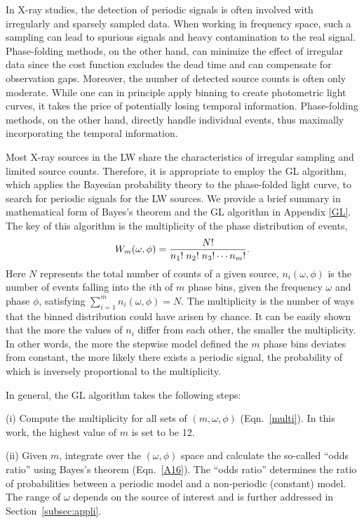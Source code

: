 \documentclass[fleqn,usenatbib]{mnras}
\begin{document}
In X-ray studies, the detection of periodic signals is often involved with irregularly and sparsely sampled data. 
When working in frequency space, such a sampling can lead to spurious signals and heavy contamination to the real signal. Phase-folding methods, on the other hand, can minimize the effect of irregular data since the cost function excludes the dead time and can compensate for observation gaps.
Moreover, the number of detected source counts is often only moderate. While one can in principle apply binning to create photometric light curves, it takes the price of potentially losing temporal information. Phase-folding methods, on the other hand, directly handle individual events, thus maximally incorporating the temporal information.

Most X-ray sources in the LW share the characteristics of irregular sampling and limited source counts. 
Therefore, it is appropriate to employ the GL algorithm, which applies the Bayesian probability theory to the phase-folded light curve, to search for periodic signals for the LW sources. We provide a brief summary in mathematical form of Bayes's theorem and the GL algorithm in Appendix \ref{GL}. 
The key of this algorithm is the multiplicity of the phase distribution of events,
\begin{equation}\label{multi}
W_m(\omega, \phi)={{N!}\over{n_1!\; n_2!\; n_3!\cdots {n_m}!}}.
\end{equation}
Here $N$ represents the total number of counts of a given source, 
$n_i(\omega, \phi)$ is the number of events falling into the $i$th of $m$ phase bins, given the frequency $\omega$ and phase $\phi$, satisfying $\sum\limits_{i=1}^{m}n_i(\omega, \phi)=N$. 
The multiplicity is the number of ways that the binned distribution could have arisen by chance. It can be easily shown that the more the values of $n_i$ differ from each other, the smaller the multiplicity. In other words, the more the stepwise model defined the $m$ phase bins deviates from constant, the more likely there exists a periodic signal, the probability of which is inversely proportional to the multiplicity.  

In general, the GL algorithm takes the following steps:

(i) Compute the multiplicity for all sets of $(m,\omega, \phi)$ (Eqn.~\ref{multi}). In this work, the highest value of $m$ is set to be 12.

(ii) Given $m$, integrate over the $(\omega, \phi)$ space and calculate the so-called ``odds ratio'' using Bayes's theorem (Eqn.~\ref{A16}). The ``odds ratio'' determines the ratio of probabilities between a periodic model and a non-periodic (constant) model. The range of $\omega$ depends on the source of interest and is further addressed in Section~\ref{subsec:appli}.
\end{document}
